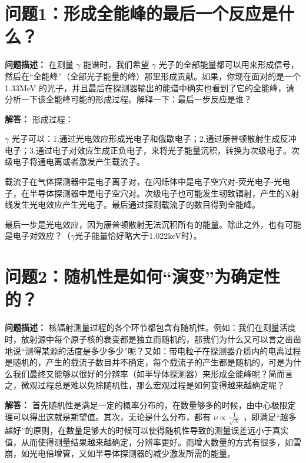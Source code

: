 \documentclass{article}
\begin{document}
\fancyfoot[C]{\thepage}

\newpage

\section{问题1：形成全能峰的最后一个反应是什么？}
\label{sec:prob1}

\textbf{问题描述：} 在测量 $\gamma$ 能谱时，我们希望 $\gamma$ 光子的全部能量都可以用来形成信号，然后在“全能峰”（全部光子能量的峰）那里形成贡献。如果，你现在面对的是一个 1.33MeV 的光子，并且最后在探测器输出的能谱中确实也看到了它的全能峰，请分析一下该全能峰可能的形成过程。解释一下：最后一步反应是谁？

\textbf{解答：} 形成过程：

$\gamma$ 光子可以：1.通过光电效应形成光电子和俄歇电子；2.通过康普顿散射生成反冲电子；3.通过电子对效应生成正负电子，来将光子能量沉积，转换为次级电子。次级电子将通电离或者激发产生载流子。

载流子在气体探测器中是电子离子对，在闪烁体中是电子空穴对-荧光电子-光电子，在半导体探测器中是电子空穴对。次级电子也可能发生韧致辐射，产生的X射线发生光电效应产生光电子。最后通过探测载流子的数目得到全能峰。

最后一步是光电效应，因为康普顿散射无法沉积所有的能量。除此之外，也有可能是电子对效应？（$\gamma$光子能量恰好略大于1.022keV时）。

\section{问题2：随机性是如何“演变”为确定性的？}
\label{sec:prob2}

\textbf{问题描述：} 核辐射测量过程的各个环节都包含有随机性。例如：我们在测量活度时，放射源中每个原子核的衰变都是独立而随机的，那我们为什么又可以言之凿凿地说“测得某源的活度是多少多少”呢？又如：带电粒子在探测器介质内的电离过程是随机的，产生的载流子数目并不确定，每个载流子的产生都是随机的，可是为什么我们最终又能够以很好的分辨率（如半导体探测器）来形成全能峰呢？简而言之，微观过程总是难以免除随机性，那么宏观过程是如何变得越来越确定呢？

\textbf{解答：} 首先随机性是满足一定的概率分布的，在数量够多的时候，由中心极限定理可以得出这就是期望值。其次，无论是什么分布，都有 $\nu \propto \frac{1}{\sqrt{N}}$ ，即满足“越多越好”的原则，在数量足够大的时候可以使得随机性导致的测量误差远小于真实值，从而使得测量结果越来越确定，分辨率更好。而增大数量的方式有很多，如雪崩，如光电倍增管，又如半导体探测器的减少激发所需的能量。
\end{document}
